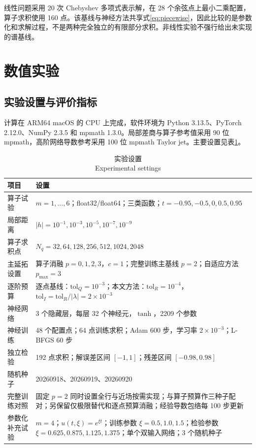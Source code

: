 \documentclass[UTF8,fontset=none,10.5pt,a4paper]{ctexart}
\numberwithin{equation}{section}
\begin{document}
线性问题采用 20 次 Chebyshev 多项式表示解\cite{Trefethen2000}，在 28 个余弦点上最小二乘配置，算子求积使用 160 点。该基线与神经方法共享式\eqref{eq:piecewise}，因此比较的是参数化和求解过程，不是两种完全独立的有限部分求积。非线性实验不强行给出未实现的谱基线。

\section{数值实验}

\subsection{实验设置与评价指标}

计算在 ARM64 macOS 的 CPU 上完成，软件环境为 Python 3.13.5、PyTorch 2.12.0、NumPy 2.3.5 和 mpmath 1.3.0。局部差商与算子参考值采用 90 位 mpmath，高阶网络导数参考采用 100 位 mpmath Taylor jet。主要设置见表\ref{tab:setup}。

\begin{table}[H]
\centering
\caption{实验设置\\Experimental settings}
\label{tab:setup}
\small
\begin{tabular}{p{3.3cm}p{10.1cm}}
\toprule
项目 & 设置\\
\midrule
算子试验 & $m=1,\ldots,6$；float32/float64；三类函数；$t=-0.95,-0.5,0,0.5,0.95$\\
局部距离 & $|h|=10^{-1},10^{-3},10^{-5},10^{-7},10^{-9}$\\
算子求积点 & $N_q=32,64,128,256,512,1024,2048$\\
主延拓设置 & 算子消融 $p=0,1,2,3$，$c=1$；完整训练主基线 $p=2$；自适应方法 $p_{\max}=3$\\
逐阶预算 & 逐点基线：$\mathrm{tol}_Q=10^{-3}$；本文方法：$\mathrm{tol}_R=10^{-4}$，$\mathrm{tol}_I=\mathrm{tol}_R/|\lambda|=2\times10^{-3}$\\
神经网络 & 3 个隐藏层，每层 32 个神经元，$\tanh$，2209 个参数\\
神经训练 & 48 个配置点；64 点训练求积；Adam 600 步，学习率 $2\times10^{-3}$；L-BFGS 60 步\\
独立检验 & 192 点求积；解误差区间 $[-1,1]$；残差区间 $[-0.98,0.98]$\\
随机种子 & 20260918、20260919、20260920\\
完整训练对照 & 固定 $p=2$ 同时设置全行与近场按需实现；与算子预算作三种子配对；另保留仅极限替代和逐点预算消融；经验导数包络每 100 步更新\\
参数化补充试验 & $m=4$；$u(t,\xi)=e^{\xi t}$；训练参数 $\xi=0.5,1.0,1.5$；检验参数 $\xi=0.625,0.875,1.125,1.375$；单个双输入网络；3 个随机种子\\
\bottomrule
\end{tabular}
\end{table}
\end{document}
